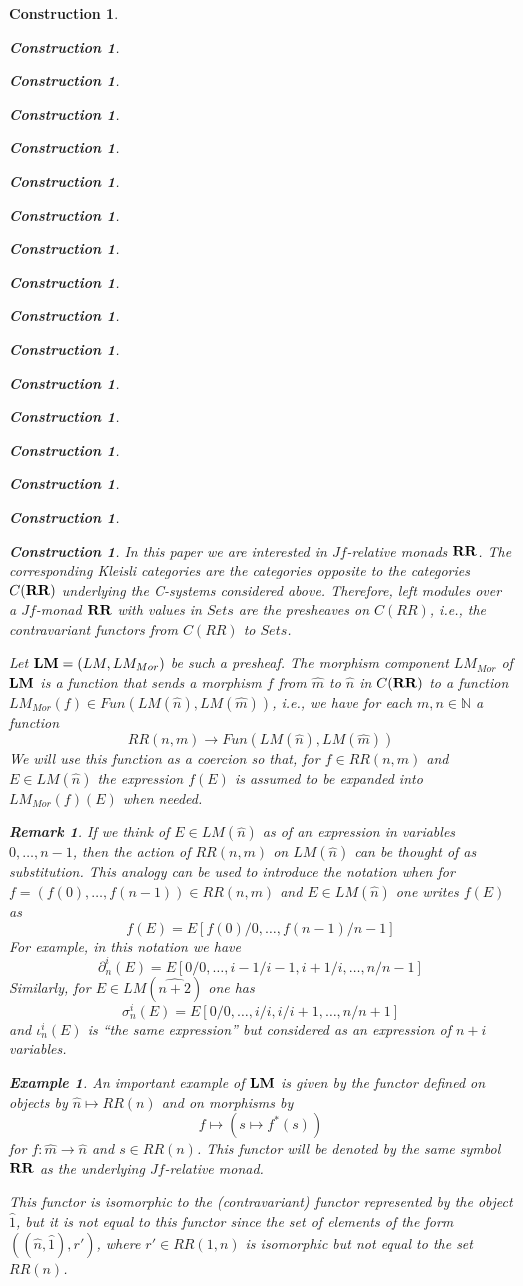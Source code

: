 \documentclass[onecolumn,12pt]{amsart}
\newtheorem{example}[proposition]{Example}
\newtheorem{remark}[proposition]{Remark}
\numberwithin{proposition}{subsection}
\newtheorem{construction}[proposition]{Construction}
\newcommand{\sr}{\rightarrow}
\newcommand{\nn}{{\mathbb N}}
\newcommand{\nat}{\nn}
\newcommand{\wh}{\widehat}
\newcommand{\mbind}[1]{{#1^*}}
\newcommand{\RR}{{\bf RR}}
\newcommand{\LM}{{\bf LM}}
\begin{document}
\begin{construction}
\begin{construction}
\begin{construction}
\begin{construction}
\begin{construction}
\begin{construction}
\begin{construction}
\begin{construction}
\begin{construction}
\begin{construction}
\begin{construction}
\begin{construction}
\begin{construction}
\begin{construction}
\begin{construction}
\begin{construction}
\begin{construction}
In this paper we are interested in $Jf$-relative monads $\RR$. The
corresponding Kleisli categories are the categories opposite to the categories
$C(\RR)$ underlying the C-systems considered above. Therefore, left modules
over a $Jf$-monad $\RR$ with values in $Sets$ are the presheaves on $C(RR)$,
i.e., the contravariant functors from $C(RR)$ to $Sets$.

Let $\LM=(LM,LM_{Mor})$ be such a presheaf.
%
%
The morphism component $LM_{Mor}$ of $\LM$ is a function that sends a morphism
$f$ from $\wh{m}$ to $\wh{n}$ in $C(\RR)$ to a function $LM_{Mor}(f)\in
Fun(LM(\wh{n}),LM(\wh{m}))$, i.e., we have for each $m,n\in\nat$ a function
%
$$RR(n,m)\sr Fun(LM(\wh{n}),LM(\wh{m}))$$
%
%
We will use this function as a coercion so that, for $f\in RR(n,m)$ and $E\in
LM(\wh{n})$ the expression $f(E)$ is assumed to be expanded into
$LM_{Mor}(f)(E)$ when needed.
%
\begin{remark}\rm
\label{2015.08.18.rem1} 
If we think of $E\in LM(\wh{n})$ as of an expression
in variables $0,\dots,n-1$, then the action of $RR(n,m)$ on $LM(\wh{n})$ can be
thought of as substitution. This analogy can be used to introduce the
notation when for $f=(f(0),\dots,f(n-1))\in RR(n,m)$ and $E\in LM(\wh{n})$ one
writes $f(E)$ as
%
$$f(E)=E[f(0)/0,\dots,f(n-1)/n-1]$$
%
For example, in this notation we have 
%
$$\partial^i_n(E)=E[0/0,\dots,i-1/i-1,i+1/i,\dots,n/n-1]$$
%
Similarly, for $E\in LM(\wh{n+2})$ one has
%
$$\sigma^i_n(E)=E[0/0,\dots,i/i,i/i+1,\dots,n/n+1]$$
%
and $\iota_n^i(E)$ is ``the same expression'' but considered as an expression of $n+i$ variables.
\end{remark}
%
\begin{example}\rm
\label{2015.09.07.rem3} 
An important example of $\LM$ is given by the functor
defined on objects by $\wh{n}\mapsto RR(n)$ and on morphisms by
%
$$f\mapsto (s\mapsto\mbind{f}(s))$$
%
for $f:\wh{m}\sr \wh{n}$ and $s\in RR(n)$.  This functor will be denoted by the
same symbol $\RR$ as the underlying $Jf$-relative monad.

This functor is isomorphic to the (contravariant) functor represented by the
object $\wh{1}$, but it is not equal to this functor since the set of elements
of the form $((\wh{n},\wh{1}),r')$, where $r'\in RR(1,n)$ is isomorphic but not
equal to the set $RR(n)$.
\end{example}


\end{construction}
\end{construction}
\end{construction}
\end{construction}
\end{construction}
\end{construction}
\end{construction}
\end{construction}
\end{construction}
\end{construction}
\end{construction}
\end{construction}
\end{construction}
\end{construction}
\end{construction}
\end{construction}
\end{construction}
\end{document}
